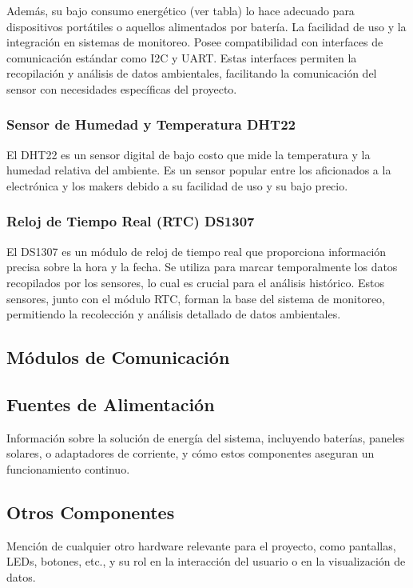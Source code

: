 Además, su bajo consumo energético (ver tabla) lo hace adecuado para dispositivos portátiles o aquellos alimentados por batería. La facilidad de uso y la integración en sistemas de monitoreo. Posee compatibilidad con interfaces de comunicación estándar como I2C y UART. Estas interfaces permiten la recopilación y análisis de datos ambientales, facilitando la comunicación del sensor con necesidades específicas del proyecto.






\subsubsection{Sensor de Humedad y Temperatura DHT22}

El DHT22 es un sensor digital de bajo costo que mide la temperatura y la humedad relativa del ambiente. Es un sensor popular entre los aficionados a la electrónica y los makers debido a su facilidad de uso y su bajo precio.




\subsubsection{Reloj de Tiempo Real (RTC) DS1307}
El DS1307 es un módulo de reloj de tiempo real que proporciona información precisa sobre la hora y la fecha. Se utiliza para marcar temporalmente los datos recopilados por los sensores, lo cual es crucial para el análisis histórico. Estos sensores, junto con el módulo RTC, forman la base del sistema de monitoreo, permitiendo la recolección y análisis detallado de datos ambientales.





\subsection{Módulos de Comunicación}





\subsection{Fuentes de Alimentación}
Información sobre la solución de energía del sistema, incluyendo baterías, paneles solares, o adaptadores de corriente, y cómo estos componentes aseguran un funcionamiento continuo.

\subsection{Otros Componentes}
Mención de cualquier otro hardware relevante para el proyecto, como pantallas, LEDs, botones, etc., y su rol en la interacción del usuario o en la visualización de datos.
